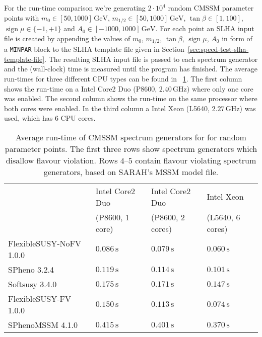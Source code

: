 \documentclass[final,3p,11pt,pdflatex]{elsarticle}
\newcommand{\code}[1]{\lstinline|#1|}  %
\newcommand{\unit}[1]{\,\text{#1}}      %
\newcommand{\secref}[1]{Section~\ref{#1}}
\newcommand{\tabref}[1]{\tablename~\ref{#1}}
\DeclareMathOperator{\sign}{sign}
\begin{document}
For the run-time comparison we're generating $2\cdot 10^{4}$ random
CMSSM parameter points with $m_0\in [50,1000]\unit{GeV}$, $m_{1/2}\in
[50,1000]\unit{GeV}$, $\tan\beta\in [1,100]$, $\sign\mu\in \{-1,+1\}$
and $A_0\in [-1000,1000]\unit{GeV}$.  For each point an SLHA input
file is created by appending the values of $m_0$, $m_{1/2}$,
$\tan\beta$, $\sign\mu$, $A_0$ in form of a \code{MINPAR} block to the
SLHA template file given in
\secref{sec:speed-test-slha-template-file}.  The resulting SLHA input
file is passed to each spectrum generator and the (wall-clock) time is
measured until the program has finished.  The average run-times for
three different CPU types can be found in
\tabref{tab:run-time-comparison}.  The first column shows the run-time
on a Intel Core2 Duo (P8600, $2.40\unit{GHz}$) where only one core was
enabled.  The second column shows the run-time on the same processor
where both cores were enabled.  In the third column a Intel Xeon
(L5640, $2.27\unit{GHz}$) was used, which has $6$ CPU cores.
%
\begin{table}[tbh]
  \centering
  \begin{tabular}{llll}
    \toprule
                            & Intel Core2 Duo    & Intel Core2 Duo   & Intel Xeon\\
                            & (P8600, 1 core)    & (P8600, 2 cores)  & (L5640, 6 cores)\\
    \midrule
    FlexibleSUSY-NoFV 1.0.0 & $0.086\unit{s}$    & $0.079\unit{s}$   & $0.060\unit{s}$\\
    SPheno 3.2.4            & $0.119\unit{s}$    & $0.114\unit{s}$   & $0.101\unit{s}$\\
    Softsusy 3.4.0          & $0.175\unit{s}$    & $0.171\unit{s}$   & $0.147\unit{s}$\\
    \midrule
    FlexibleSUSY-FV 1.0.0   & $0.150\unit{s}$    & $0.113\unit{s}$   & $0.074\unit{s}$\\
    SPhenoMSSM 4.1.0        & $0.415\unit{s}$    & $0.401\unit{s}$   & $0.370\unit{s}$\\
    \bottomrule
  \end{tabular}
  \caption{Average run-time of CMSSM spectrum generators for
    for random parameter points.  The first three rows show
    spectrum generators which disallow flavour violation.  Rows
    $4$--$5$ contain flavour violating spectrum generators, based
    on SARAH's MSSM model file.}
  \label{tab:run-time-comparison}
\end{table}
\end{document}
